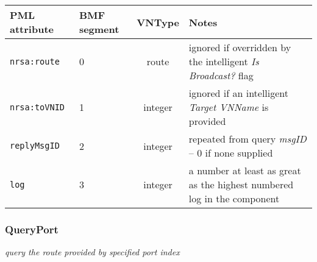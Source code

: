 \documentclass[pdftex,a4paper]{article}
\newcommand{\XMLfont}[1]{{\tt \small #1}}
\begin{document}
\begin{table}[!h]
  \begin{center}
    \label{tab:ReplyMaxLog}
    \begin{tabular}{|l|p{13mm}|c|p{60mm}|}
      \hline

      \textbf{PML attribute} & \textbf{BMF segment} & \textbf{VNType}
      & \textbf{Notes} \\\hline

      \XMLfont{nrsa:route} & 0 & route & ignored if overridden by the
      intelligent {\em Is Broadcast?} flag \\ \hline

      \XMLfont{nrsa:toVNID} & 1 & integer & ignored if an intelligent {\em
      Target VNName} is provided \\\hline

      \XMLfont{replyMsgID} & 2 & integer & repeated from query {\em
      msgID} -- 0 if none supplied \\\hline

      \XMLfont{log} & 3 & integer & a number at least as great
      as the highest numbered log in the component \\\hline

    \end{tabular}
  \end{center}
\end{table}

\clearpage

\subsubsection{QueryPort}

{\em query the route provided by specified port index}
\end{document}

